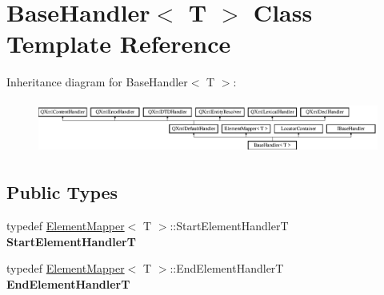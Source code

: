 \hypertarget{class_base_handler}{}\section{Base\+Handler$<$ T $>$ Class Template Reference}
\label{class_base_handler}
Inheritance diagram for Base\+Handler$<$ T $>$\+:\begin{figure}[H]
\begin{center}
\leavevmode
\includegraphics[height=1.726619cm]{class_base_handler}
\end{center}
\end{figure}
\subsection*{Public Types}
\begin{DoxyCompactItemize}
\item 
\mbox{\label{class_base_handler_abd6c0f29385e3c9d63d739cd053e2d9b}} 
typedef \mbox{\hyperlink{class_element_mapper}{Element\+Mapper}}$<$ T $>$\+::Start\+Element\+HandlerT {\bfseries Start\+Element\+HandlerT}
\item 
\mbox{\label{class_base_handler_a3cad3be3bcd3f337d8032d51d555053e}} 
typedef \mbox{\hyperlink{class_element_mapper}{Element\+Mapper}}$<$ T $>$\+::End\+Element\+HandlerT {\bfseries End\+Element\+HandlerT}
\end{DoxyCompactItemize}
